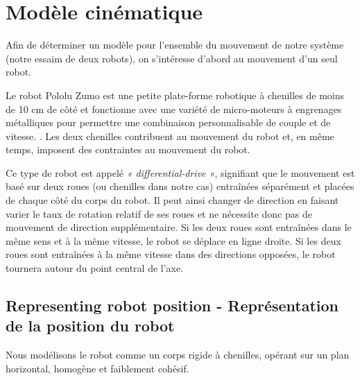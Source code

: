 \section{Modèle cinématique}

Afin de déterminer un modèle pour l'ensemble du mouvement de notre système (notre essaim de deux robots), on s'intéresse d'abord au mouvement d'un seul robot. 

Le robot Pololu Zumo est une petite plate-forme robotique à chenilles de moins de 10 cm de côté et fonctionne avec une variété de micro-moteurs à engrenages métalliques pour permettre une combinaison personnalisable de couple et de vitesse. \cite{pololu-url}. Les deux chenilles contribuent au mouvement du robot et, en même temps, imposent des contraintes au mouvement du robot. 

Ce type de robot est appelé \textit{« differential-drive »}, signifiant que le mouvement est basé sur deux roues (ou chenilles dans notre cas) entraînées séparément et placées de chaque côté du corps du robot. Il peut ainsi changer de direction en faisant varier le taux de rotation relatif de ses roues et ne nécessite donc pas de mouvement de direction supplémentaire. Si les deux roues sont entraînées dans le même sens et à la même vitesse, le robot se déplace en ligne droite. Si les deux roues sont entraînées à la même vitesse dans des directions opposées, le robot tournera autour du point central de l'axe. \cite{Differential-drive-wikipedia-url}

\subsection{Representing robot position - Représentation de la position du robot}

Nous modélisons le robot comme un corps rigide à chenilles, opérant sur un plan horizontal, homogène et faiblement cohésif. 

